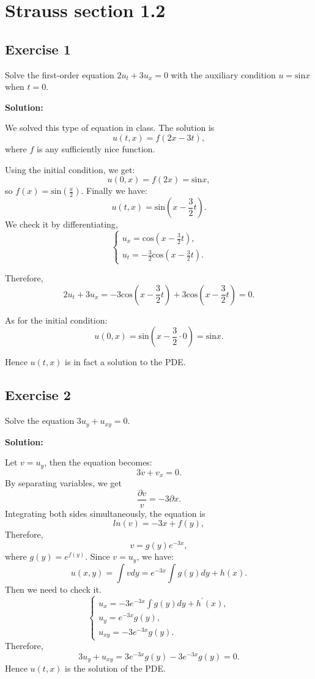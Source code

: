 \documentclass{article}
\begin{document}
\section{Strauss section 1.2}
\subsection{Exercise 1}
			Solve the first-order equation
			$2u_t +3u_ x =0$ with the auxiliary condition $u=\text{sin}x$ when $t=0.$

\textbf{Solution:}

			We solved this type of equation in class.
			The solution is 
			\[ u(t,x)=f(2x-3t),\]
			where $f$ is any sufficiently nice function.

			Using the initial condition, we get:
			\[u(0,x)=f(2x)=\text{sin}x,\]
			so $f(x)=\text{sin}\left(\frac{x}{2}\right)$.
			Finally we have:
			\[u(t,x)=\text{sin}\left(x-\frac{3}{2}t\right).\]
			We check it by differentiating,
			\begin{equation*}
				\begin{cases}
					u_x=\text{cos}\left(x-\frac{3}{2}t\right),
					\\
					u_t=-\frac{3}{2}\text{cos}\left(x-\frac{3}{2}t\right).
				\end{cases}
			\end{equation*}

			Therefore,
			\[ 2u_t +3u_x=-3\text{cos}\left(x-\frac{3}{2}t\right) + 3\text{cos}\left(x-\frac{3}{2}t\right)=0.\]

			As for the initial condition:
			\[u(0,x)=\text{sin}\left(x-\frac{3}{2}\cdot0\right)=\text{sin}x.\]

			Hence $u(t,x)$ is in fact a solution to the PDE.

		\subsection{Exercise 2}
		Solve the equation $3u_y + u_{xy} =0.$

		\textbf{Solution:}

			Let $v=u_y$, then the equation becomes:
			\[3v+v_x=0.\]
			By separating variables, we get \[\frac{\partial v}{v}=-3\partial x.\]
			Integrating both sides simultaneously, the equation is \[ ln(v) = -3x + f(y),  \]
			Therefore, \[ v = g(y)e^{-3x},\]
			where $g(y)=e^{f(y)}$.
			Since $v=u_y$, we have:
			\[u(x,y)=\int vdy = e^{-3x}\int g(y)dy + h(x).\]
			Then we need to check it.
			\begin{equation*}
				\begin{cases}
					u_{x}=-3e^{-3x}\int g(y)dy + h^{'}(x),
					\\
					u_{y}=e^{-3x} g(y),
					\\
					u_{xy}=-3e^{-3x} g(y).
				\end{cases}
			\end{equation*}
			Therefore, \[3u_y + u_{xy}=3e^{-3x} g(y)-3e^{-3x} g(y)=0.\]
            Hence $u(t,x)$ is the solution of the PDE.
\end{document}
